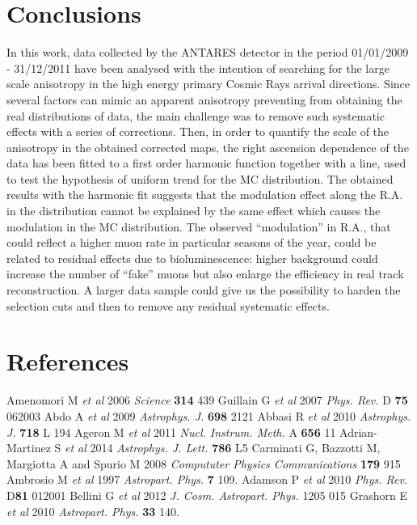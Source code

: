 \documentclass[a4paper]{jpconf}
\begin{document}
\section{Conclusions}
In this work, data collected by the ANTARES detector in the period 01/01/2009 - 31/12/2011 have been analysed with the intention of searching for the large scale anisotropy in the high energy primary Cosmic Rays arrival directions. Since several factors can mimic an apparent anisotropy preventing from obtaining the real distributions of data, the main challenge was to remove such systematic effects with a series of corrections. Then, in order to quantify the scale of the anisotropy in the obtained corrected maps, the right ascension dependence of the data has been fitted to a first order harmonic function together with a line, used to test the hypothesis of uniform trend for the MC distribution. The obtained results with the harmonic fit suggests that the modulation effect along the R.A. in the distribution cannot be explained by the same effect which causes the modulation in the MC distribution. The observed ``modulation'' in R.A., that could reflect a higher muon rate in particular seasons of the year, could be related to residual effects due to bioluminescence: higher background could increase the number of ``fake'' muons but also enlarge the efficiency in real track reconstruction. A larger data sample could give us the possibility to harden the selection cuts and then to remove any residual systematic effects. 



\section*{References}
\begin{thebibliography}{9}
 Amenomori M \emph{et al} 2006 \emph{Science} \textbf{314} 439
 Guillain G \emph{et al} 2007 \emph{Phys. Rev.} D \textbf{75} 062003
 Abdo A  \emph{et al} 2009 \emph{Astrophys. J.} \textbf{698} 2121
 Abbasi R \emph{et al} 2010 \emph{Astrophys. J.} \textbf{718} L 194 
  Ageron M \emph{et al}  2011 \emph{Nucl. Instrum. Meth. } A \textbf{656} 11
 Adrian-Martinez S \emph{et al} 2014 \emph{Astrophys. J. Lett.} \textbf{786} L5
 Carminati G, Bazzotti M, Margiotta A and Spurio M 2008 \emph{Compututer Physics Communications} \textbf{179} 915
 Ambrosio M \emph{et al} 1997 \emph{Astropart. Phys.} \textbf{7} 109.
 Adamson P \emph{et al} 2010 \emph{Phys. Rev.} D\textbf{81} 012001
 Bellini G \emph{ et al} 2012 \emph{ J. Cosm. Astropart. Phys.} 1205  015 
 Grashorn E \emph{et al} 2010 \emph{Astropart. Phys.} \textbf{33} 140.

\end{thebibliography}
\end{document}
